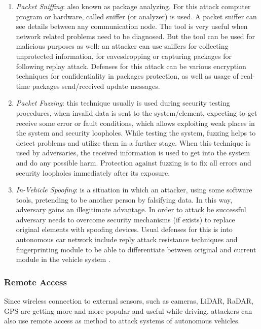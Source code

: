 \begin{enumerate}
\begin{enumerate}
		\item \textit{Packet Sniffing}: also known as package analyzing. For this attack computer program or hardware, called sniffer (or analyzer) is used. A packet sniffer can see details between any communication node. The tool is very useful when network related problems need to be diagnosed. But the tool can be used for malicious purposes as well: an attacker can use sniffers for collecting unprotected information, for eavesdropping or capturing packages for following replay attack. Defenses for this attack can be various encryption techniques for confidentiality in packages protection, as well as usage of real-time packages send/received update messages.
		\item \textit{Packet Fuzzing}: this technique usually is used during security testing procedures, when invalid data is sent to the system/element, expecting to get receive some error or fault conditions, which allows exploiting weak places in the system and security loopholes. While testing the system, fuzzing helps to detect problems and utilize them in a further stage. When this technique is used by adversaries, the received information is used to get into the system and do any possible harm. Protection against fuzzing is to fix all errors and security loopholes immediately after its exposure. 
		\item \textit{In-Vehicle Spoofing}: is a situation in which an attacker, using some software tools, pretending to be another person by falsifying data. In this way, adversary gains an illegitimate advantage. In order to attack be successful adversary needs to overcome security mechanisms (if exists) to replace original elements with spoofing devices. Usual defenses for this is into autonomous car network include reply attack resistance techniques and fingerprinting module to be able to differentiate between original and current module in the vehicle system \cite{attacTax1}.
	\end{enumerate}
\end{enumerate}

\subsubsection{Remote Access}
Since wireless connection to external sensors, such as cameras, \gls{LiDAR}, \gls{RaDAR}, \gls{GPS} are getting more and more popular and useful while driving, attackers can also use remote access as method to attack systems of autonomous vehicles. 


